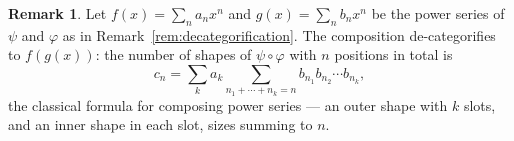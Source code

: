 \documentclass[11pt, a4paper]{article}
\theoremstyle{definition}
\newtheorem{remark}[definition]{Remark}
\theoremstyle{plain}
\begin{document}
\noindent\colorbox{blue!10}{\parbox{\dimexpr\linewidth-2\fboxsep}{%
\begin{remark}\label{rem:power-series}
Let $f(x) = \sum_n a_n x^n$ and $g(x) = \sum_n b_n x^n$ be the power
series of $\psi$ and $\varphi$ as in
Remark~\ref{rem:decategorification}.  The composition de-categorifies
to $f(g(x))$: the number of shapes of
$\psi \circ \varphi$ with $n$ positions in total is
\[
  c_n = \sum_{k} a_k \sum_{n_1 + \cdots + n_k = n}
  b_{n_1} b_{n_2} \cdots b_{n_k},
\]
the classical formula for composing power series --- an outer shape with
$k$ slots, and an inner shape in each slot, sizes summing to $n$.
\end{remark}%
}}
\end{document}
